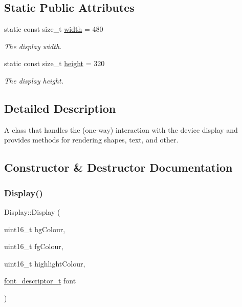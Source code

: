 \subsection*{Static Public Attributes}
\begin{DoxyCompactItemize}
\item 
\mbox{\label{classDisplay_a6f1dec624224569510e05c937d33ac4d}} 
static const size\+\_\+t \mbox{\hyperlink{classDisplay_a6f1dec624224569510e05c937d33ac4d}{width}} = 480
\begin{DoxyCompactList}\small\item\em The display width. \end{DoxyCompactList}\item 
\mbox{\label{classDisplay_ac677f0db63e8eef2373fe84791cad17c}} 
static const size\+\_\+t \mbox{\hyperlink{classDisplay_ac677f0db63e8eef2373fe84791cad17c}{height}} = 320
\begin{DoxyCompactList}\small\item\em The display height. \end{DoxyCompactList}\end{DoxyCompactItemize}


\subsection{Detailed Description}
A class that handles the (one-\/way) interaction with the device display and provides methods for rendering shapes, text, and other. 

\subsection{Constructor \& Destructor Documentation}
\mbox{\label{classDisplay_a579fdca9754b50088f77dcb7ba3489ac}} 
\subsubsection{\texorpdfstring{Display()}{Display()}}
{\footnotesize\ttfamily Display\+::\+Display (\begin{DoxyParamCaption}\item[{uint16\+\_\+t}]{bg\+Colour,  }\item[{uint16\+\_\+t}]{fg\+Colour,  }\item[{uint16\+\_\+t}]{highlight\+Colour,  }\item[{\mbox{\hyperlink{structfont__descriptor__t}{font\+\_\+descriptor\+\_\+t}}}]{font }\end{DoxyParamCaption})}



